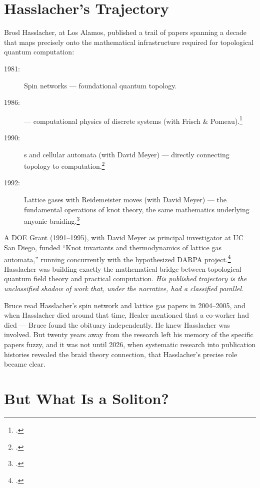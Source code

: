 \section*{Hasslacher's Trajectory}
\label{pos10:hasslachers-trajectory}

Brosl Hasslacher, at Los Alamos, published a trail of papers spanning a decade that maps precisely onto the mathematical infrastructure required for topological quantum computation:

\begin{description}
\item[1981:] Spin networks --- foundational quantum topology.
\item[1986:]  --- computational physics of discrete systems (with Frisch \& Pomeau).\footcite{frisch1986}
\item[1990:] s and cellular automata (with David Meyer) --- directly connecting topology to computation.\footcite{hasslacher1990}
\item[1992:] Lattice gases with Reidemeister moves (with David Meyer) --- the fundamental operations of knot theory, the same mathematics underlying anyonic braiding.\footcite{hasslacher1992}
\end{description}

A DOE Grant (1991--1995), with David Meyer as principal investigator at UC San Diego, funded ``Knot invariants and thermodynamics of lattice gas automata,'' running concurrently with the hypothesized DARPA project.\footcite{meyer1995doe} Hasslacher was building exactly the mathematical bridge between topological quantum field theory and practical computation. \textit{His published trajectory is the unclassified shadow of work that, under the narrative, had a classified parallel.}

Bruce read Hasslacher's spin network and lattice gas papers in 2004--2005, and when Hasslacher died around that time, Healer mentioned that a co-worker had died --- Bruce found the obituary independently. He knew Hasslacher was involved. But twenty years away from the research left his memory of the specific papers fuzzy, and it was not until 2026, when systematic research into publication histories revealed the braid theory connection, that Hasslacher's precise role became clear.

\section*{But What Is a Soliton?}
\label{pos10:but-what-is-a-soliton}

